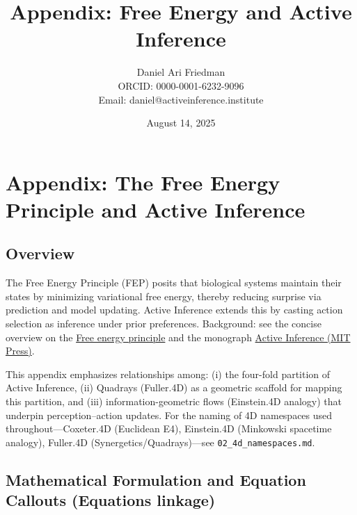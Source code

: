 \documentclass[
  10pt,
]{article}
\title{Appendix: Free Energy and Active Inference}
\author{Daniel Ari Friedman\\ ORCID: 0000-0001-6232-9096\\ Email: daniel@activeinference.institute}
\date{August 14, 2025}
\begin{document}
\maketitle

{
\hypersetup{linkcolor=red}
\setcounter{tocdepth}{3}
\tableofcontents
}
\hypertarget{appendix-the-free-energy-principle-and-active-inference}{%
\section{Appendix: The Free Energy Principle and Active
Inference}\label{appendix-the-free-energy-principle-and-active-inference}}

\hypertarget{overview}{%
\subsection{Overview}\label{overview}}

The Free Energy Principle (FEP) posits that biological systems maintain
their states by minimizing variational free energy, thereby reducing
surprise via prediction and model updating. Active Inference extends
this by casting action selection as inference under prior preferences.
Background: see the concise overview on the
\href{https://en.wikipedia.org/wiki/Free_energy_principle}{Free energy
principle} and the monograph
\href{https://direct.mit.edu/books/oa-monograph/5299/Active-InferenceThe-Free-Energy-Principle-in-Mind}{Active
Inference (MIT Press)}.

This appendix emphasizes relationships among: (i) the four-fold
partition of Active Inference, (ii) Quadrays (Fuller.4D) as a geometric
scaffold for mapping this partition, and (iii) information-geometric
flows (Einstein.4D analogy) that underpin perception--action updates.
For the naming of 4D namespaces used throughout---Coxeter.4D (Euclidean
E4), Einstein.4D (Minkowski spacetime analogy), Fuller.4D
(Synergetics/Quadrays)---see \texttt{02\_4d\_namespaces.md}.

\hypertarget{mathematical-formulation-and-equation-callouts-equations-linkage}{%
\subsection{Mathematical Formulation and Equation Callouts (Equations
linkage)}\label{mathematical-formulation-and-equation-callouts-equations-linkage}}
\end{document}

